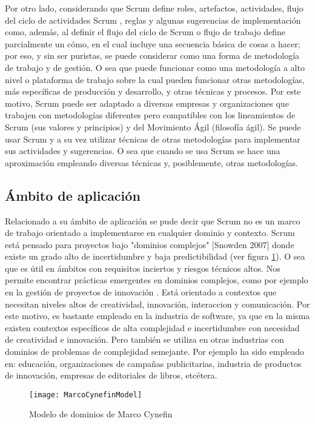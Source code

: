 Por otro lado, considerando que Scrum define roles, artefactos, actividades, flujo del ciclo de actividades Scrum \cite{Agile-Atlas-2012}, reglas y algunas sugerencias de implementación como, además, al definir el flujo del ciclo de Scrum o flujo de trabajo define parcialmente un cómo, en el cual incluye una secuencia básica de cosas a hacer; por eso, y sin ser puristas, se puede considerar como una forma de metodología de trabajo y de gestión. O sea que puede funcionar como una metodología a alto nivel o plataforma de trabajo sobre la cual pueden funcionar otras metodologías, más específicas de producción y desarrollo, y otras técnicas y procesos. Por este motivo, 
Scrum puede ser adaptado a diversas empresas y organizaciones que trabajen con metodologías diferentes pero compatibles con los 
lineamientos de Scrum (sus valores y principios) y del Movimiento Ágil (filosofía ágil). Se puede usar Scrum y a su vez utilizar técnicas de otras metodologías para implementar sus actividades y sugerencias. O sea que cuando se usa Scrum se hace una aproximación empleando diversas técnicas y, posiblemente, otras metodologías.

\subsection{Ámbito de aplicación}

Relacionado a su ámbito de aplicación se pude decir que Scrum no es un marco de trabajo orientado a implementarse en cualquier dominio y contexto. Scrum está pensado para proyectos bajo "dominios complejos" [Snowden 2007] donde existe un grado alto de incertidumbre y baja predictibilidad (ver figura \ref{fig:MarcoCynefinModel}). O sea que es útil en ámbitos con requisitos inciertos y riesgos técnicos altos. Nos permite encontrar prácticas emergentes en dominios complejos, como por ejemplo en la gestión de proyectos de innovación \cite{Martin-Alaimo-2014}. Está orientado a contextos que necesitan niveles altos de creatividad, innovación, interaccion y comunicación. Por este motivo, es bastante empleado en la industria de software, ya que en la misma existen contextos específicos de alta complejidad e incertidumbre con necesidad de creatividad e innovación. Pero también se utiliza en otras industrias con dominios de problemas de complejidad semejante. Por ejemplo ha sido empleado en: educación, organizaciones de campañas publicitarias, industria de productos de innovación, empresas de editoriales de libros, etcétera.

\begin{figure}[h]
  \centering
  \texttt{[image: MarcoCynefinModel]}
  \caption{Modelo de dominios de Marco Cynefin}
  \centering
  \label{fig:MarcoCynefinModel} %
\end{figure}

